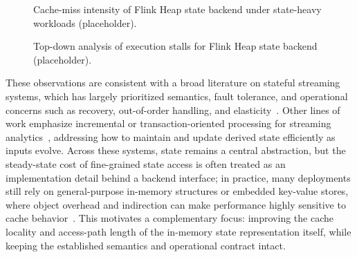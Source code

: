 \documentclass[sigconf]{acmart}
\begin{document}
\begin{figure}[t]
  \centering
  \caption{Cache-miss intensity of Flink Heap state backend under state-heavy workloads (placeholder).}
  \label{fig:primary-cache-miss}
\end{figure}

\begin{figure}[t]
  \centering
  \caption{Top-down analysis of execution stalls for Flink Heap state backend (placeholder).}
  \label{fig:primary-topdown}
\end{figure}

These observations are consistent with a broad literature on stateful streaming systems, which has largely prioritized semantics, fault tolerance, and operational concerns such as recovery, out-of-order handling, and elasticity~\cite{akidau2013millwheel,akidau2015dataflow,murray2013naiad,carbone2017flinkstate,hoffmann2019megaphone}.
Other lines of work emphasize incremental or transaction-oriented processing for streaming analytics~\cite{chandramouli2014trill,ahmad2012dbtoaster,meehan2015sstore}, addressing how to maintain and update derived state efficiently as inputs evolve.
Across these systems, state remains a central abstraction, but the steady-state cost of fine-grained state access is often treated as an implementation detail behind a backend interface; in practice, many deployments still rely on general-purpose in-memory structures or embedded key-value stores, where object overhead and indirection can make performance highly sensitive to cache behavior~\cite{carbone2017flinkstate}.
This motivates a complementary focus: improving the cache locality and access-path length of the in-memory state representation itself, while keeping the established semantics and operational contract intact.
\end{document}
